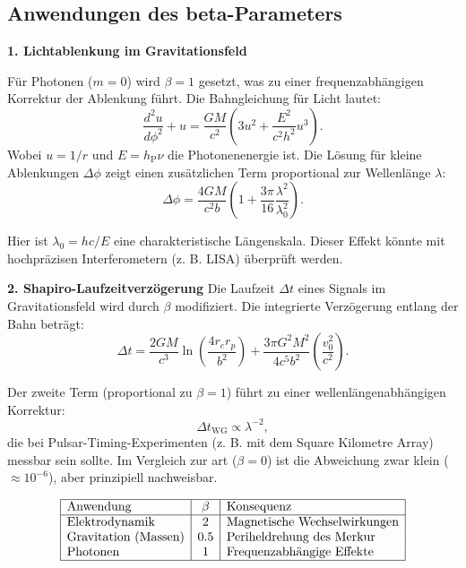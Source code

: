 \subsection{Anwendungen des beta-Parameters}
\textbf{1. Lichtablenkung im Gravitationsfeld}

Für Photonen ($m=0$) wird $\beta=1$ gesetzt, was zu einer frequenzabhängigen Korrektur der Ablenkung führt. Die Bahngleichung für Licht lautet:
\begin{equation}
    \frac{d^2u}{d\phi^2} + u = \frac{GM}{c^2} \left(3u^2 + \frac{E^2}{c^2 h^2} u^3\right).
\end{equation}
Wobei $u=1/r$ und $E=h_\text{P}\nu$ die Photonenenergie ist. Die Lösung für kleine Ablenkungen $\Delta\phi$ zeigt einen zusätzlichen Term proportional zur Wellenlänge $\lambda$:
\begin{equation}
\Delta \phi = \frac{4GM}{c^2 b} \left(1 + \frac{3\pi}{16} \frac{\lambda^2}{\lambda_0^2}\right).
\end{equation}

Hier ist $\lambda_0=hc/E$ eine charakteristische Längenskala. Dieser Effekt könnte mit hochpräzisen Interferometern (z. B. LISA) überprüft werden.

\textbf{2. Shapiro-Laufzeitverzögerung}
Die Laufzeit $\Delta t$ eines Signals im Gravitationsfeld wird durch $\beta$ modifiziert. Die integrierte Verzögerung entlang der Bahn beträgt:
\begin{equation}
\Delta t = \frac{2GM}{c^3} \ln\left(\frac{4r_e r_p}{b^2}\right) + \frac{3\pi G^2 M^2}{4c^5 b^2} \left(\frac{v_0^2}{c^2}\right).
\end{equation}

Der zweite Term (proportional zu $\beta=1$) führt zu einer wellenlängenabhängigen Korrektur:
\begin{equation}
    \Delta t_\text{WG} \propto \lambda^{-2},
\end{equation}
die bei Pulsar-Timing-Experimenten (z. B. mit dem Square Kilometre Array) messbar sein sollte. Im Vergleich zur \gls{art} ($\beta=0$) ist die Abweichung zwar klein ($\approx 10^{-6}$),
aber prinzipiell nachweisbar.

\[
\begin{array}{|l|c|l|}
\hline
\text{Anwendung} & \beta & \text{Konsequenz} \\
\hline
\text{Elektrodynamik} & 2 & \text{Magnetische Wechselwirkungen} \\
\text{Gravitation (Massen)} & 0.5 & \text{Periheldrehung des Merkur} \\
\text{Photonen} & 1 & \text{Frequenzabhängige Effekte} \\
\hline
\end{array}
\]

